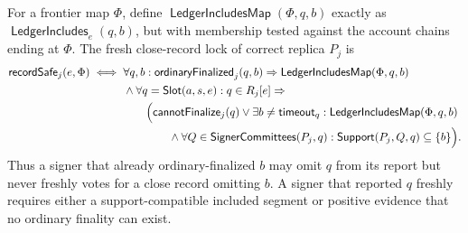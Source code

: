 \documentclass[sigplan,twocolumn,review,anonymous]{acmart}
\newcommand{\func}[1]{\operatorname{\mathsf{#1}}}
\newcommand{\Slot}{\func{Slot}}
\newcommand{\SignerCommittees}{\func{SignerCommittees}}
\newcommand{\timeoutVal}{\mathsf{timeout}}
\newcommand{\ordinaryFinalized}{\func{ordinaryFinalized}}
\newcommand{\cannotFinalize}{\func{cannotFinalize}}
\newcommand{\recordSafe}{\func{recordSafe}}
\newcommand{\LedgerIncludesMap}{\func{LedgerIncludesMap}}
\begin{document}
For a frontier map \(\Phi\), define \(\LedgerIncludesMap(\Phi,q,b)\) exactly as
\(\func{LedgerIncludes}_e(q,b)\), but with membership tested against the account chains ending at
\(\Phi\).  The fresh close-record lock of correct replica \(P_j\) is
\[
\begin{aligned}
\recordSafe_j(e,\Phi)\iff{}&
\forall q,b:\ordinaryFinalized_j(q,b)\Rightarrow\LedgerIncludesMap(\Phi,q,b)\\
&\wedge\forall q=\Slot(a,s,e):q\in R_j[e]\Rightarrow\\
&\qquad\Bigl(\cannotFinalize_j(q)\vee\exists b\neq\timeoutVal_q:
\LedgerIncludesMap(\Phi,q,b)\\
&\qquad\qquad\wedge\forall Q\in\SignerCommittees(P_j,q):
\func{Support}(P_j,Q,q)\subseteq\{b\}\Bigr).
\end{aligned}
\]
Thus a signer that already ordinary-finalized \(b\) may omit \(q\) from its report but never freshly
votes for a close record omitting \(b\).  A signer that reported \(q\) freshly requires either a
support-compatible included segment or positive evidence that no ordinary finality can exist.
\end{document}
